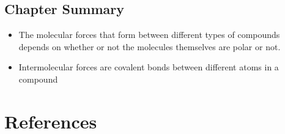 \documentclass{scrartcl}
\begin{document}
\subsection{Chapter Summary}
\label{sec:org55b6554}
\begin{itemize}
\item The molecular forces that form between different types of compounds depends on whether or not the molecules themselves are polar or not.
\item Intermolecular forces are covalent bonds between different atoms in a compound
\end{itemize}
\section{References}
\label{sec:org3003daf}
\begin{hangparas}{1.5em}{1}

\end{hangparas}
\end{document}
